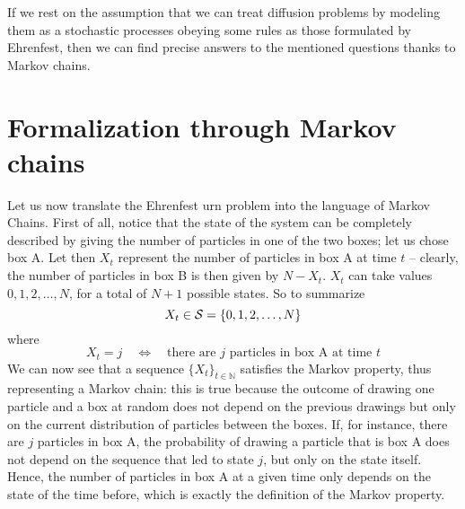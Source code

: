 If we rest on the assumption that we can treat diffusion problems by modeling them as a stochastic processes obeying some rules as those formulated by Ehrenfest, then we can find precise answers to the mentioned questions thanks to Markov chains.

\section{Formalization through Markov chains}
Let us now translate the Ehrenfest urn problem into the language of Markov Chains. 
First of all, notice that the state of the system can be completely described by giving the number of particles in one of the two boxes; let us chose box A. Let then $X_t$ represent the number of particles in box A at time $t$ -- clearly, the number of particles in box B is then given by $N - X_t$. $X_t$ can take values $0, 1, 2, \dots, N$, for a total of $N + 1$ possible states. So to summarize
\begin{equation}
    X_t \in \mathcal{S} = \{ 0, 1, 2, \dots, N \}
\end{equation}
where
\begin{equation}
    X_t = j \quad \Leftrightarrow \quad \text{there are $j$ particles in box A at time $t$}
\end{equation}
We can now see that a sequence $\{X_t\}_{t\in \mathbb{N}}$ satisfies the Markov property, thus representing a Markov chain: this is true because the outcome of drawing one particle and a box at random does not depend on the previous drawings but only on the current distribution of particles between the boxes. If, for instance, there are $j$ particles in box A, the probability of drawing a particle that is box A does not depend on the sequence that led to state $j$, but only on the state itself. Hence, the number of particles in box A at a given time only depends on the state of the time before, which is exactly the definition of the Markov property.

